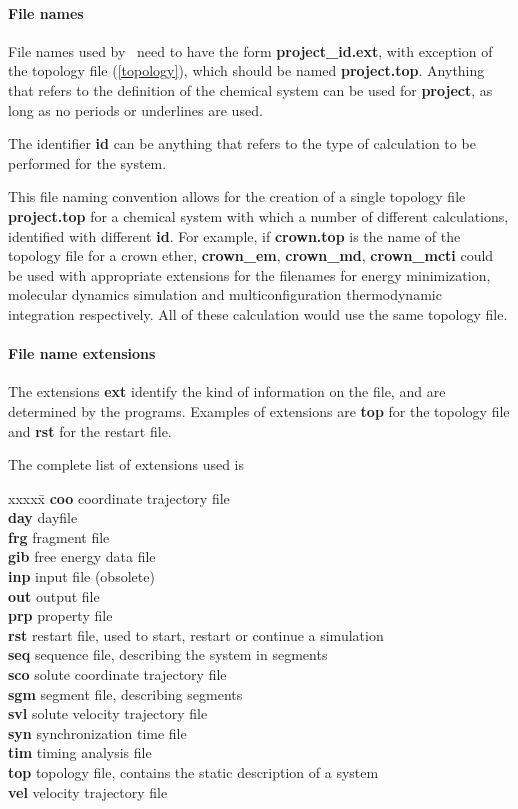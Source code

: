 \paragraph{File names}
\label{filenames}
\par
File names used by \nwargos\  need to have the form
{\bf project\_id.ext}, with exception of the
topology file (\ref{topology}), which should be named {\bf project.top}.
Anything that refers to the definition of the chemical system can be used
for {\bf project}, as long as no periods or underlines are used.
\par
The identifier {\bf id} can be anything that refers to the type of 
calculation to be performed for the system.
\par
This file naming convention allows for the creation of a single topology file
{\bf project.top} for a chemical system with which a number of different 
calculations, identified with different {\bf id}.
For example, if {\bf crown.top} is the name of the topology file for
a crown ether, {\bf crown\_em}, {\bf crown\_md}, {\bf crown\_mcti} could
be used with appropriate extensions for the filenames for energy
minimization, molecular dynamics simulation and multiconfiguration
thermodynamic integration respectively. All of these calculation
would use the same topology file.
\paragraph{File name extensions}
\label{extensions}
\par
The extensions {\bf ext} 
identify the kind of information on the file, and are determined by the 
programs. Examples of extensions are {\bf top} for the topology file and 
{\bf rst} for the restart file.
\par
The complete list of extensions used is
\begin{tabbing}
xxxxx\=\kill
{\bf coo} \> coordinate trajectory file\\
{\bf day} \> dayfile\\
{\bf frg} \> fragment file\\
{\bf gib} \> free energy data file\\
{\bf inp} \> input file (obsolete)\\
{\bf out} \> output file\\
{\bf prp} \> property file\\
{\bf rst} \> restart file, used to start, restart or continue a simulation \\
{\bf seq} \> sequence file, describing the system in segments\\
{\bf sco} \> solute coordinate trajectory file\\
{\bf sgm} \> segment file, describing segments\\
{\bf svl} \> solute velocity trajectory file\\
{\bf syn} \> synchronization time file\\
{\bf tim} \> timing analysis file\\
{\bf top} \> topology file, contains the static description of a system\\
{\bf vel} \> velocity trajectory file\\
\end{tabbing}
